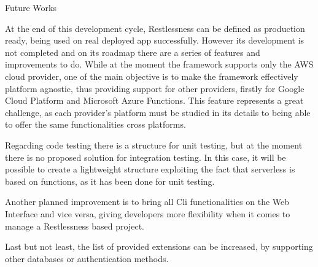 \begin{chapter}{Future Works}

    At the end of this development cycle, Restlessness can be defined as production
    ready, being used on real deployed app successfully.
    However its development is not completed and on its roadmap there are a series
    of features and improvements to do. While at the moment the framework supports
    only the AWS cloud provider, one of the main objective is to make the framework
    effectively platform agnostic, thus providing support for other providers, firstly
    for Google Cloud Platform and Microsoft Azure Functions. This feature represents
    a great challenge, as each provider's platform must be studied in its details
    to being able to offer the same functionalities cross platforms.

    Regarding code testing there is a structure for unit testing, but at the moment
    there is no proposed solution for integration testing. In this case, it will be
    possible to create a lightweight structure exploiting the fact that serverless
    is based on functions, as it has been done for unit testing.

    Another planned improvement is to bring all Cli functionalities on the Web
    Interface and vice versa, giving developers more flexibility when it comes
    to manage a Restlessness based project.

    Last but not least, the list of provided extensions can be increased, by
    supporting other databases or authentication methods.

\end{chapter}